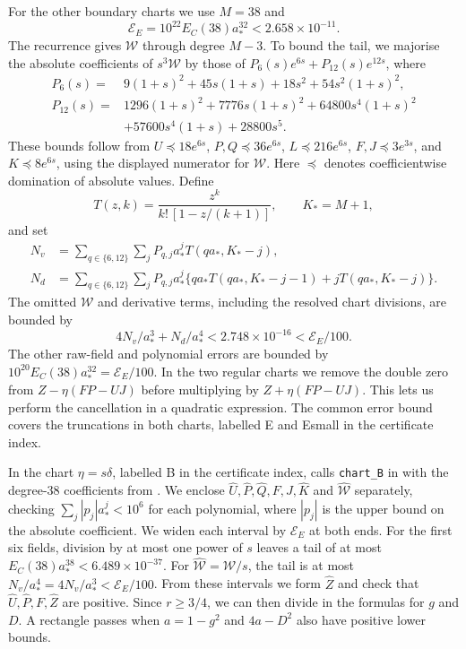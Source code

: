 \documentclass[a4paper,11pt]{amsart}
\numberwithin{equation}{section}
\theoremstyle{plain}
\theoremstyle{definition}
\begin{document}
For the other boundary charts we use \(M=38\) and
\[
 \mathcal E_E=10^{22}E_C(38)a_*^{32}<2.658\times10^{-11}.
\]
The recurrence gives \(\mathcal W\) through degree \(M-3\).
To bound the tail, we majorise the absolute coefficients of
\(s^3\mathcal W\) by those of
$P_6(s)e^{6s}+P_{12}(s)e^{12s}$, where
\begin{align*}
 P_6(s)={}&9(1+s)^2+45s(1+s)+18s^2+54s^2(1+s)^2,\\
 P_{12}(s)={}&1296(1+s)^2+7776s(1+s)^2
       +64800s^4(1+s)^2\\
       &+57600s^4(1+s)+28800s^5.
\end{align*}
These bounds follow from
$U\preceq18e^{6s}$, $P,Q\preceq36e^{6s}$,
$L\preceq216e^{6s}$, $F,J\preceq3e^{3s}$,
and $K\preceq8e^{6s}$, using the displayed numerator for
$\mathcal W$. Here $\preceq$ denotes coefficientwise domination
of absolute values. Define
\[
 T(z,k)=\frac{z^k}{k!\,[1-z/(k+1)]},\qquad K_*=M+1,
\]
and set
\begin{align*}
 N_v&=\sum_{q\in\{6,12\}}\sum_j
        P_{q,j}a_*^jT(qa_*,K_*-j),\\
 N_d&=\sum_{q\in\{6,12\}}\sum_jP_{q,j}a_*^j
    \{qa_*T(qa_*,K_*-j-1)+jT(qa_*,K_*-j)\}.
\end{align*}
The omitted $\mathcal W$ and derivative terms, including the
resolved chart divisions, are bounded by
\[
 4N_v/a_*^3+N_d/a_*^4<2.748\times10^{-16}<\mathcal E_E/100.
\]
The other raw-field and polynomial errors are bounded by
$10^{20}E_C(38)a_*^{32}=\mathcal E_E/100$.
In the two regular charts we remove the double zero from
\(Z-\eta(FP-UJ)\) before multiplying by \(Z+\eta(FP-UJ)\).
This lets us perform the cancellation in a quadratic expression.
The common error bound covers the truncations in both charts,
labelled E and Esmall in the certificate index.

In the chart \(\eta=s\delta\), labelled B in the certificate
index,  calls
\texttt{chart\_B} in  with the
degree-$38$ coefficients from .
We enclose \(\widehat U,\widehat P,\widehat Q,F,J,\widehat K\)
and \(\widehat{\mathcal W}\) separately, checking
\(\sum_j|p_j|a_*^j<10^6\) for each polynomial, where \(|p_j|\)
is the upper bound on the absolute coefficient. We widen each
interval by \(\mathcal E_E\) at both ends. For the first six fields,
division by at most one power of \(s\) leaves a tail of at most
$E_C(38)a_*^{38}<6.489\times10^{-37}$. For
$\widehat{\mathcal W}=\mathcal W/s$, the tail is at most
$N_v/a_*^4=4N_v/a_*^3<\mathcal E_E/100$.
From these intervals we form \(\widehat Z\) and check that
\(\widehat U,\widehat P,F,\widehat Z\) are positive.
Since \(r\ge3/4\), we can then divide in the formulas for \(g\)
and \(D\). A rectangle passes when \(a=1-g^2\) and \(4a-D^2\)
also have positive lower bounds.
\end{document}
